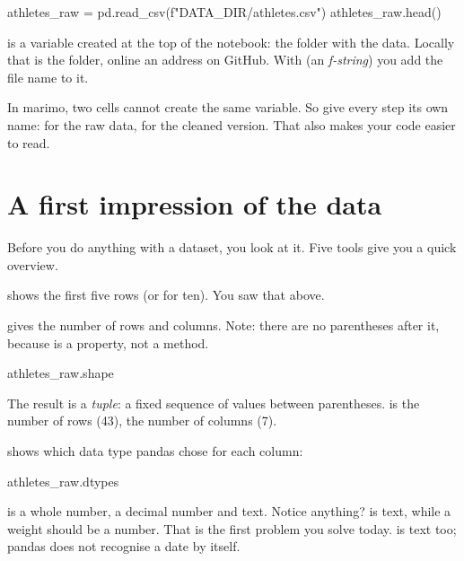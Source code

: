 \documentclass[11pt,a4paper]{article}
\begin{document}
\begin{python}
athletes_raw = pd.read_csv(f"{DATA_DIR}/athletes.csv")
athletes_raw.head()
\end{python}

 is a variable created at the top of the notebook: the
folder with the data. Locally that is the  folder, online
an address on GitHub. With  (an
\emph{f-string}) you add the file name to it.

\begin{watchout}
In marimo, two cells cannot create the same variable. So give every
step its own name:  for the raw data,
 for the cleaned version. That also makes your
code easier to read.
\end{watchout}

\section{A first impression of the data}

Before you do anything with a dataset, you look at it. Five tools give
you a quick overview.

\textbf{} shows the first five rows (or 
for ten). You saw that above.

\textbf{} gives the number of rows and columns. Note:
there are no parentheses after it, because  is a property,
not a method.

\begin{python}
athletes_raw.shape
\end{python}

The result is a \emph{tuple}: a fixed sequence of values between
parentheses.  is the number of rows (43),
 the number of columns (7).

\textbf{} shows which data type pandas chose for each
column:

\begin{python}
athletes_raw.dtypes
\end{python}

 is a whole number,  a decimal number and
 text. Notice anything?  is text, while a
weight should be a number. That is the first problem you solve today.
 is text too; pandas does not recognise a date by
itself.
\end{document}
